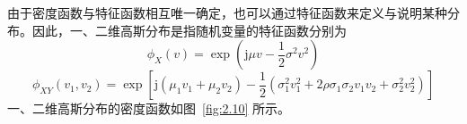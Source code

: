 \documentclass[11pt,openany,UTF8]{ctexbook}
\newcommand{\ju}{\mathrm{j}}                       %
\begin{document}
由于密度函数与特征函数相互唯一确定\nobreak，也可以通过特征函数来定义与说明某种分布\nobreak。因此\nobreak，一\nobreak、二维高斯分布是指随机变量的特征函数分别为
\begin{equation}
\phi_X(v)=\exp\left(\ju\mu v-\frac{1}{2}\sigma^2 v^2\right)
\label{eq:2.26}
\end{equation}
\begin{equation}
\phi_{XY}(v_1,v_2)=\exp\left[\ju(\mu_1 v_1+\mu_2 v_2)-\frac{1}{2}\left(\sigma_1^2 v_1^2+2\rho\sigma_1\sigma_2 v_1 v_2+\sigma_2^2 v_2^2\right)\right]
\label{eq:2.27}
\end{equation}
一\nobreak、二维高斯分布的密度函数如图~\ref{fig:2.10} 所示\nobreak。


\end{document}
